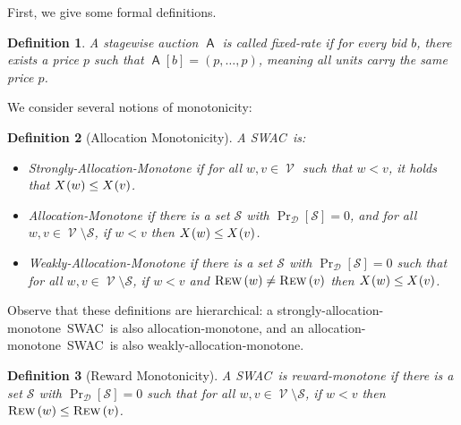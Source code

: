\documentclass[11pt,letterpaper]{article}
\newcommand{\hide}[1]{ }
\newcommand{\Bnote}[1]{ {\color{cyan} Batya: #1}}
\newcommand{\samono}{strongly-allocation-monotone\xspace}
\newcommand{\Samono}{Strongly-Allocation-Monotone\xspace}
\newcommand{\amono}{allocation-monotone\xspace}
\newcommand{\Amono}{Allocation-Monotone\xspace}
\newcommand{\wamono}{weakly-allocation-monotone\xspace}
\newcommand{\Wamono}{Weakly-Allocation-Monotone\xspace}
\newcommand{\rmono}{reward-monotone\xspace}
\newcommand{\fr}{fixed-rate\xspace}
\newcommand{\swac}{SWAC\xspace}
\DeclareMathOperator{\A}{\auc{A}}
\DeclareMathOperator{\D}{\mathcal{D}}
\renewcommand{\S}{\mathcal{S}}
\DeclareMathOperator{\V}{\mathcal{V}}
\theoremstyle{plain}
\newtheorem{proposition}[theorem]{Proposition}
\newtheorem{definition}{Definition}
\newcommand{\auc}[1]{\mathsf{#1}}
\begin{document}


\hide{
\Bnote{I think this is more confusing than helpful}
\begin{proposition}
    Let $\A$ be a truthful auction
    where
    for some bid $v \in \V$
    there is a filter $\f[\A]{v} > v$,
    and let $\A'$ be identical to $\A$,
    except that we remove the filter on $v$
    by flattening the payment schedule,
    charging a fixed-rate payment of $\p[\A]{v} / \x[\A]{v}$
    on each of the $\x[\A]{v}$ days allocated.
    If any agent $w$ changes their bid in $\A'$ compared to $\A$,
    then $w < v$,
    and the new bid of agent $w$ is $v$ (i.e., agent $w$ now overbids).
\end{proposition}
}

First, we give some formal definitions.
\begin{definition}
    A stagewise auction $\A$ is called \textnormal{\fr}
    if for every bid $b$,
    there exists a price $p$
    such that $\A[b] = (p,\ldots,p)$,
    meaning all units carry the same price $p$.
\end{definition}

 We consider several notions of monotonicity:

\begin{definition}[Allocation Monotonicity]\label{def:allocation-monotonicity}
    A \swac\ is:
    \begin{itemize}
        \item \textnormal{\Samono} if for all $w,v\in \V$ such that $w<v$, it holds that $\x{w}\leq \x{v}$.
        \item \textnormal{\Amono} if there is a set $\S$ with $\Pr_{\D}[\S]=0$, and for all $w,v\in\V\setminus\S$, if $w<v$ then $\x{w}\leq \x{v}$.
        \item \textnormal{\Wamono} if there is a set $\S$ with $\Pr_{\D}[\S]=0$ such that for all $w,v\in\V\setminus\S$, if $w<v$ and $\trew{w}\neq \trew{v}$ then $\x{w}\leq \x{v}$.
    \end{itemize}
\end{definition}
Observe that these definitions are hierarchical: a \samono\ \swac\ is also \amono, and an \amono\ \swac\ is also \wamono.


\begin{definition}[Reward Monotonicity]\label{def:rmono}
    A \swac\ is \textnormal{\rmono} if there is a set $\S$ with $\Pr_{\D}[\S]=0$ such that for all $w,v\in\V\setminus\S$, if $w<v$ then $\trew{w}\leq\trew{v}$.
\end{definition}
\end{document}
